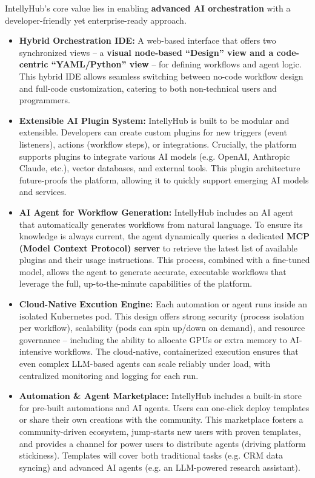 IntellyHub's core value lies in enabling \textbf{advanced AI orchestration} with a developer-friendly yet enterprise-ready approach.
\begin{itemize}
    \item \textbf{Hybrid Orchestration IDE:} A web-based interface that offers two synchronized views – a \textbf{visual node-based “Design” view and a code-centric “YAML/Python” view} – for defining workflows and agent logic. This hybrid IDE allows seamless switching between no-code workflow design and full-code customization, catering to both non-technical users and programmers.
    
    \item \textbf{Extensible AI Plugin System:} IntellyHub is built to be modular and extensible. Developers can create custom plugins for new triggers (event listeners), actions (workflow steps), or integrations. Crucially, the platform supports plugins to integrate various AI models (e.g. OpenAI, Anthropic Claude, etc.), vector databases, and external tools. This plugin architecture future-proofs the platform, allowing it to quickly support emerging AI models and services.
    
    \item \textbf{AI Agent for Workflow Generation:} IntellyHub includes an AI agent that automatically generates workflows from natural language. To ensure its knowledge is always current, the agent dynamically queries a dedicated \textbf{MCP (Model Context Protocol) server} to retrieve the latest list of available plugins and their usage instructions. This process, combined with a fine-tuned model, allows the agent to generate accurate, executable workflows that leverage the full, up-to-the-minute capabilities of the platform.
    
    \item \textbf{Cloud-Native Excution Engine:} Each automation or agent runs inside an isolated Kubernetes pod. This design offers strong security (process isolation per workflow), scalability (pods can spin up/down on demand), and resource governance – including the ability to allocate GPUs or extra memory to AI-intensive workflows. The cloud-native, containerized execution ensures that even complex LLM-based agents can scale reliably under load, with centralized monitoring and logging for each run.
    
    \item \textbf{Automation \& Agent Marketplace:} IntellyHub includes a built-in store for pre-built automations and AI agents. Users can one-click deploy templates or share their own creations with the community. This marketplace fosters a community-driven ecosystem, jump-starts new users with proven templates, and provides a channel for power users to distribute agents (driving platform stickiness). Templates will cover both traditional tasks (e.g. CRM data syncing) and advanced AI agents (e.g. an LLM-powered research assistant).
    

\end{itemize}
